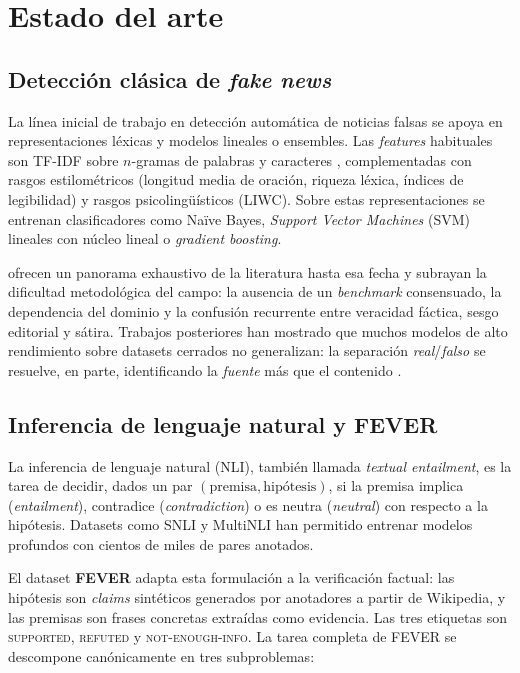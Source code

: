 \chapter{Estado del arte}\label{cap:estado-arte}

\section{Detección clásica de \emph{fake news}}

La línea inicial de trabajo en detección automática de noticias falsas se
apoya en representaciones léxicas y modelos lineales o ensembles. Las
\emph{features} habituales son TF-IDF sobre $n$-gramas de palabras y
caracteres \citep{conroy2015automatic}, complementadas con rasgos
estilométricos (longitud media de oración, riqueza léxica, índices de
legibilidad) y rasgos psicolingüísticos (LIWC). Sobre estas
representaciones se entrenan clasificadores como Naïve Bayes,
\emph{Support Vector Machines} (SVM) lineales con núcleo lineal o
\emph{gradient boosting}.

\citet{shu2017fake} ofrecen un panorama exhaustivo de la literatura
hasta esa fecha y subrayan la dificultad metodológica del campo: la
ausencia de un \emph{benchmark} consensuado, la dependencia del dominio
y la confusión recurrente entre veracidad fáctica, sesgo editorial y
sátira. Trabajos posteriores han mostrado que muchos modelos de alto
rendimiento sobre datasets cerrados no generalizan: la separación
\emph{real}/\emph{falso} se resuelve, en parte, identificando la
\emph{fuente} más que el contenido \citep{ahmed2017detection}.

\section{Inferencia de lenguaje natural y \textsc{FEVER}}

La inferencia de lenguaje natural (NLI), también llamada \emph{textual
entailment}, es la tarea de decidir, dados un par
$(\text{premisa}, \text{hipótesis})$, si la premisa implica
(\emph{entailment}), contradice (\emph{contradiction}) o es neutra
(\emph{neutral}) con respecto a la hipótesis. Datasets como SNLI
\citep{bowman2015snli} y MultiNLI \citep{williams2018multinli} han
permitido entrenar modelos profundos con cientos de miles de pares
anotados.

El dataset \textbf{FEVER} \citep{thorne2018fever} adapta esta
formulación a la verificación factual: las hipótesis son
\emph{claims} sintéticos generados por anotadores a partir de Wikipedia,
y las premisas son frases concretas extraídas como evidencia. Las tres
etiquetas son \textsc{supported}, \textsc{refuted} y
\textsc{not-enough-info}. La tarea completa de FEVER se descompone
canónicamente en tres subproblemas:

